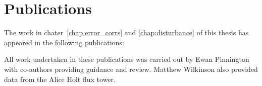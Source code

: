 \chapter*{\centering \Large \vspace{-20mm}\Huge Publications}


\nobibliography*

The work in chater~\ref{chap:error_corrs} and \ref{chap:disturbance} of this thesis has appeared in the following publications:



All work undertaken in these publications was carried out by Ewan Pinnington with co-authors providing guidance and review. Matthew Wilkinson also provided data from the Alice Holt flux tower.
